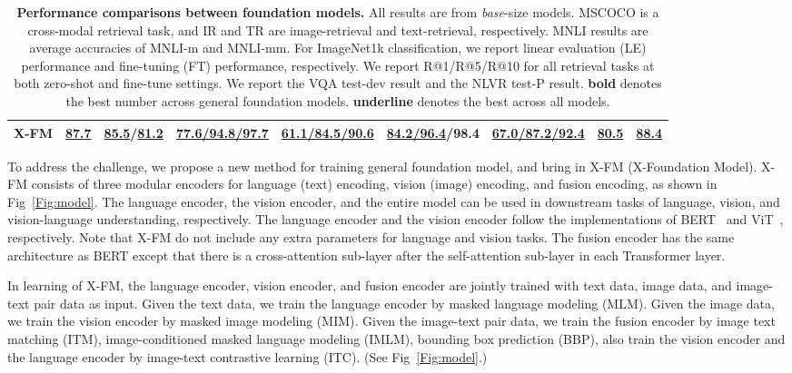 \documentclass[11pt]{article}
\newcommand{\ModelName}{X-FM\xspace}
\newcommand{\ModelNameB}{X-FM\xspace}
\begin{document}
\begin{table*}[ht]
{\begin{tabular}{l | c | c | c c c c c c}
{\bf \ModelNameB} & {\bf \underline {87.7}} & {\bf \underline{85.5}}/{\bf \underline {81.2}} & {\bf \underline {77.6/94.8/97.7}} & {\bf \underline {61.1/84.5/90.6}} & {\bf \underline {84.2/96.4}/98.4} & {\bf \underline {67.0/87.2/92.4}} & {\bf \underline {80.5}} & {\bf \underline {88.4}} \\
\bottomrule
\end{tabular}
}
\caption{\textbf{Performance comparisons between foundation models.}
All results are from \textit{base}-size models. MSCOCO is a cross-modal retrieval task, and IR and TR are image-retrieval and text-retrieval, respectively.
MNLI results are average accuracies of MNLI-m and MNLI-mm.
For ImageNet1k classification, we report linear evaluation (LE) performance and fine-tuning (FT) performance, respectively.
We report R@1/R@5/R@10 for all retrieval tasks at both zero-shot and fine-tune settings.
We report the VQA test-dev result and the NLVR test-P result.
\textbf{bold} denotes the best number across general foundation models.
\textbf{underline} denotes the best across all models. }
\label{tab:compare_FMs}
\end{table*}

To address the challenge, we propose a new method for training general foundation model, and bring in {\ModelName} (X-Foundation Model). {\ModelName} consists of three modular encoders for language (text) encoding, vision (image) encoding, and fusion encoding, as shown in Fig~\ref{Fig:model}. The language encoder, the vision encoder, and the entire model can be used in downstream tasks of language, vision, and vision-language understanding, respectively. The language encoder and the vision encoder follow the implementations of BERT~\citep{devlin2018bert} and ViT~\cite{dosovitskiy2020image}, respectively. Note that {\ModelName} do not include any extra parameters for language and vision tasks. The fusion encoder has the same architecture as BERT except that there is a cross-attention sub-layer after the self-attention sub-layer in each Transformer layer.

In learning of {\ModelName}, the language encoder, vision encoder, and fusion encoder are jointly trained with text data, image data, and image-text pair data as input. Given the text data, we train the language encoder by masked language modeling (MLM). Given the image data, we train the vision encoder by masked image modeling (MIM). Given the image-text pair data, we train the fusion encoder by image text matching (ITM), image-conditioned masked language modeling (IMLM), bounding box prediction (BBP), also train the vision encoder and the language encoder by image-text contrastive learning (ITC). (See Fig~\ref{Fig:model}.)
\end{document}
